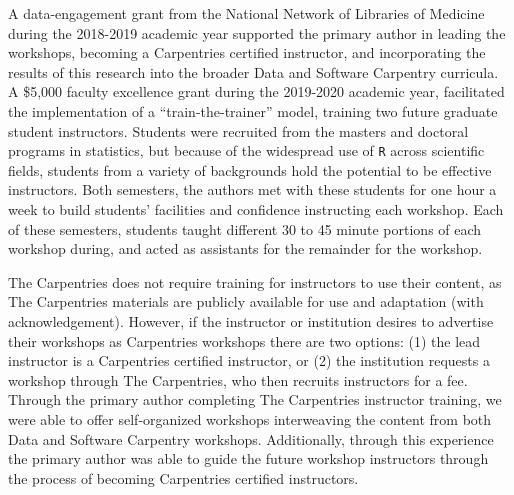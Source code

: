 \documentclass[12pt]{article}
\begin{document}
\quad A data-engagement grant from the National Network of Libraries of Medicine
during the 2018-2019 academic year supported the primary author in leading the
workshops, becoming a Carpentries certified instructor, and incorporating the
results of this research into the broader Data and Software Carpentry curricula.
A \$5,000 faculty excellence grant during the 2019-2020 academic year,
facilitated the implementation of a ``train-the-trainer'' model, training two 
future graduate student instructors. Students were recruited from the masters
and doctoral programs in statistics, but because of the widespread use of 
\texttt{R} across scientific fields, students from a variety of backgrounds hold
the potential to be effective instructors. Both semesters, the authors met with 
these students for one hour a week to build students' facilities and confidence
instructing each workshop. Each of these semesters, students taught different 
30 to 45 minute portions of each workshop during, and acted as assistants for
the remainder for the workshop.  


\quad The Carpentries does not require training for instructors to use their
content, as The Carpentries materials are publicly available for use and 
adaptation (with acknowledgement). However, if the instructor or institution
desires to advertise their workshops as Carpentries workshops there are two 
options: (1) the lead instructor is a Carpentries certified instructor, or (2)
the institution requests a workshop through The Carpentries, who then recruits 
instructors for a fee. Through the primary author completing The Carpentries
instructor training, we were able to offer self-organized workshops interweaving 
the content from both Data and Software Carpentry workshops. Additionally, 
through this experience the primary author was able to guide the future 
workshop instructors through the process of becoming Carpentries certified
instructors. 
\end{document}
